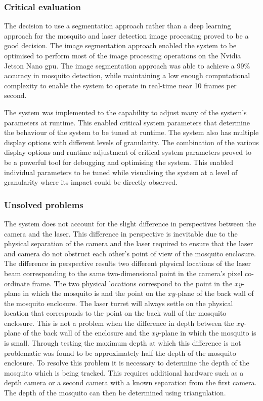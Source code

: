 \subsubsection{Critical evaluation}
The decision to use a segmentation approach rather than a deep learning approach for the mosquito and laser detection image processing proved to be a good decision. The image segmentation approach enabled the system to be optimised to perform most of the image processing operations on the Nvidia Jetson Nano \gls{gpu}. The image segmentation approach was able to achieve a 99\% accuracy in mosquito detection, while maintaining a low enough computational complexity to enable the system to operate in real-time near 10 frames per second.

The system was implemented to the capability to adjust many of the system's parameters at runtime. This enabled critical system parameters that determine the behaviour of the system to be tuned at runtime. The system also has multiple display options with different levels of granularity. The combination of the various display options and runtime adjustment of critical system parameters proved to be a powerful tool for debugging and optimising the system. This enabled individual parameters to be tuned while visualising the system at a level of granularity where its impact could be directly observed.

\subsubsection{Unsolved problems}\label{sec:unsolved_problems}
The system does not account for the slight difference in perspectives between the camera and the laser. This difference in perspective is inevitable due to the physical separation of the camera and the laser required to ensure that the laser and camera do not obstruct each other's point of view of the mosquito enclosure. The difference in perspective results two different physical locations of the laser beam corresponding to the same two-dimensional point in the camera's pixel co-ordinate frame. The two physical locations correspond to the point in the $xy$-plane in which the mosquito is and the point on the $xy$-plane of the back wall of the mosquito enclosure. The laser turret will always settle on the physical location that corresponds to the point on the back wall of the mosquito enclosure. This is not a problem when the difference in depth between the $xy$-plane of the back wall of the enclosure and the $xy$-plane in which the mosquito is is small. Through testing the maximum depth at which this difference is not problematic was found to be approximately half the depth of the mosquito enclosure. To resolve this problem it is necessary to determine the depth of the mosquito which is being tracked. This requires additional hardware such as a depth camera or a second camera with a known separation from the first camera. The depth of the mosquito can then be determined using triangulation.

